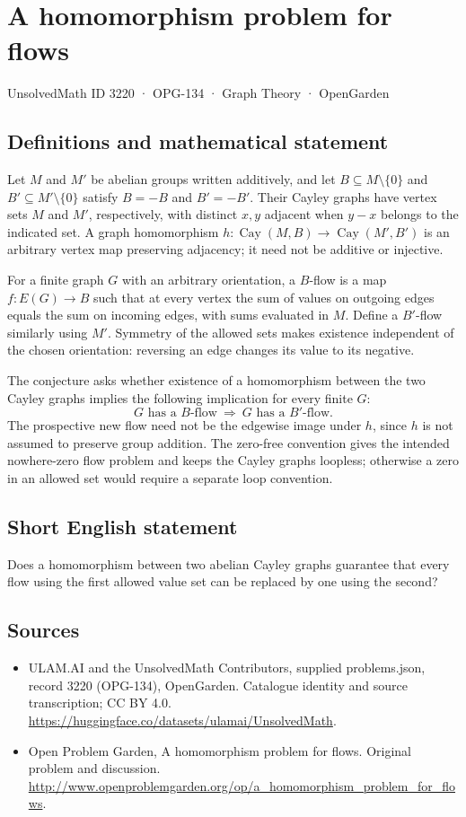 \documentclass[11pt,a4paper]{article}
\begin{document}
\section*{A homomorphism problem for flows}\label{3220}
{\small UnsolvedMath ID 3220 · OPG-134 · Graph Theory · OpenGarden}
\subsection{Definitions and mathematical statement}
Let $M$ and $M'$ be abelian groups written additively, and let $B\subseteq M\setminus\{0\}$ and $B'\subseteq M'\setminus\{0\}$ satisfy $B=-B$ and $B'=-B'$. Their Cayley graphs have vertex sets $M$ and $M'$, respectively, with distinct $x,y$ adjacent when $y-x$ belongs to the indicated set. A graph homomorphism $h:\operatorname{Cay}(M,B)\to\operatorname{Cay}(M',B')$ is an arbitrary vertex map preserving adjacency; it need not be additive or injective.

For a finite graph $G$ with an arbitrary orientation, a $B$-flow is a map $f:E(G)\to B$ such that at every vertex the sum of values on outgoing edges equals the sum on incoming edges, with sums evaluated in $M$. Define a $B'$-flow similarly using $M'$. Symmetry of the allowed sets makes existence independent of the chosen orientation: reversing an edge changes its value to its negative.

The conjecture asks whether existence of a homomorphism between the two Cayley graphs implies the following implication for every finite $G$:
\[
       G\text{ has a }B\text{-flow}
       \ \Longrightarrow\ G\text{ has a }B'\text{-flow}.
\]
The prospective new flow need not be the edgewise image under $h$, since $h$ is not assumed to preserve group addition. The zero-free convention gives the intended nowhere-zero flow problem and keeps the Cayley graphs loopless; otherwise a zero in an allowed set would require a separate loop convention.
\subsection{Short English statement}
Does a homomorphism between two abelian Cayley graphs guarantee that every flow using the first allowed value set can be replaced by one using the second?
\subsection{Sources}
\begin{itemize}
\item[S1] ULAM.AI and the UnsolvedMath Contributors, supplied problems.json, record 3220 (OPG-134), OpenGarden. Catalogue identity and source transcription; CC BY 4.0.
\url{https://huggingface.co/datasets/ulamai/UnsolvedMath}.
\item[S2] Open Problem Garden, A homomorphism problem for flows. Original problem and discussion.
\url{http://www.openproblemgarden.org/op/a_homomorphism_problem_for_flows}.
\end{itemize}
\end{document}

